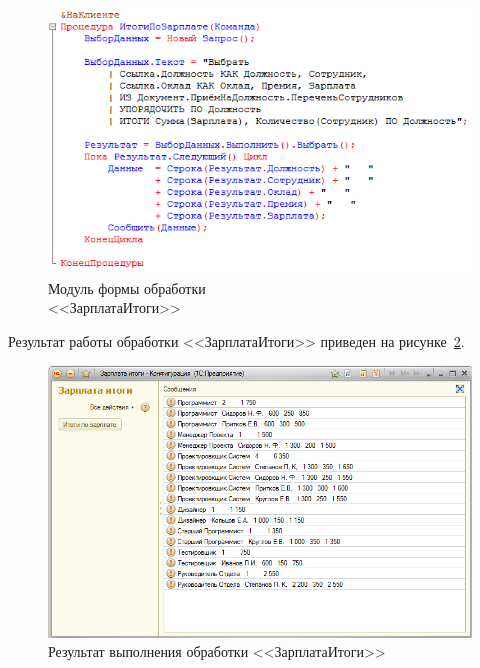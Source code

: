 \begin{figure}[h!]
  \centering
  \includegraphics[width=160mm]{pic/salary_amount_code}
  \caption{Модуль формы обработки \\ <<ЗарплатаИтоги>>}
  \label{fig:salary_amount_code}
\end{figure}

\pagebreak

Результат работы обработки <<ЗарплатаИтоги>> приведен
на рисунке~\ref{fig:salary_amount_results}.
\begin{figure}[h!]
  \centering
  \includegraphics[width=160mm]{pic/salary_amount_results}
  \caption{Результат выполнения обработки <<ЗарплатаИтоги>>}
  \label{fig:salary_amount_results}
\end{figure}




